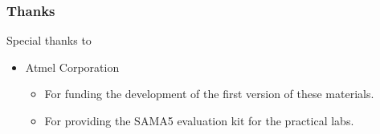 \begin{frame}
\frametitle{Thanks}
   Special thanks to
   \begin{itemize}
     \item Atmel Corporation \\
     \begin{itemize}
	   \item For funding the development of the first version of
                 these materials.
	   \item For providing the SAMA5 evaluation kit for the
		 practical labs.
     \end{itemize}
   \end{itemize}
\end{frame}
